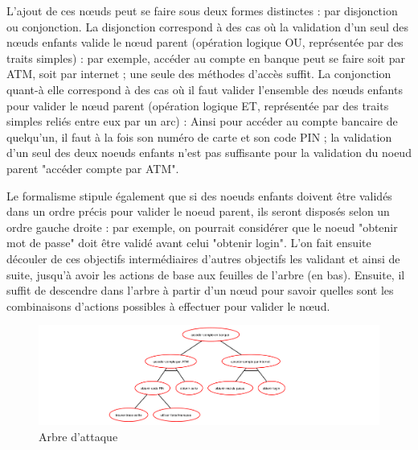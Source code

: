         L'ajout de ces nœuds peut se faire sous deux formes distinctes : par disjonction ou conjonction. La disjonction correspond à des cas où la validation d'un seul des nœuds enfants valide le nœud parent (opération logique OU, représentée par des traits simples) : par exemple, accéder au compte en banque peut se faire soit par ATM, soit par internet ; une seule des méthodes d'accès suffit. La conjonction quant-à elle correspond à des cas où il faut valider l'ensemble des nœuds enfants pour valider le nœud parent (opération logique ET, représentée par des traits simples reliés entre eux par un arc) : Ainsi pour accéder au compte bancaire de quelqu'un, il faut à la fois son numéro de carte et son code PIN ; la validation d'un seul des deux noeuds enfants n'est pas suffisante pour la validation du noeud parent "accéder compte par ATM". 

        Le formalisme stipule également que si des noeuds enfants doivent être validés dans un ordre précis pour valider le noeud parent, ils seront disposés selon un ordre gauche droite : par exemple, on pourrait considérer que le noeud "obtenir mot de passe" doit être validé avant celui "obtenir login". L'on fait ensuite découler de ces objectifs intermédiaires d'autres objectifs les validant et ainsi de suite, jusqu'à avoir les actions de base aux feuilles de l'arbre (en bas). Ensuite, il suffit de descendre dans l'arbre à partir d'un nœud pour savoir quelles sont les combinaisons d'actions possibles à effectuer pour valider le nœud.

        \begin{figure}[htbp]
        \centering
        \includegraphics[width=\textwidth]{figure/exemple1_rapport.pdf}%
        \caption{Arbre d'attaque}
        \label{fig:arbre_exemple_1}
        \end{figure}

